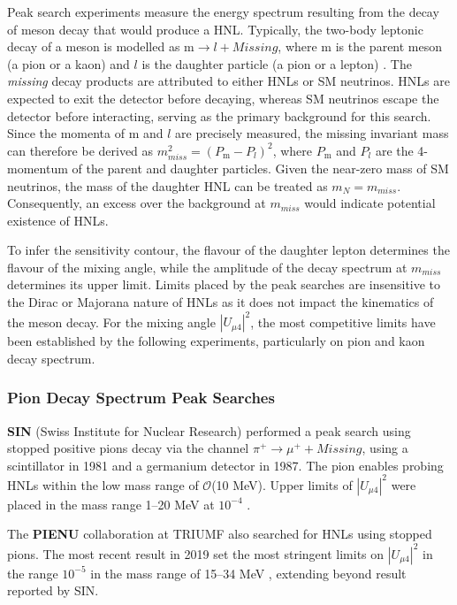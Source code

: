 Peak search experiments measure the energy spectrum  resulting from the decay of meson decay that would produce a HNL. 
Typically, the two-body leptonic decay of a meson is modelled as $\text{m}\rightarrow l + Missing$, where $\text{m}$ is the parent meson (a pion or a kaon) and $l$ is the daughter particle (a pion or a lepton) \cite{OwenPhD}.
The \textit{missing} decay products are attributed to either HNLs or SM neutrinos.
HNLs are expected to exit the detector before decaying, whereas SM neutrinos escape the detector before interacting, serving as the primary background for this search.
Since the momenta of m and $l$ are precisely measured, the missing invariant mass can therefore be derived as $m^{2}_{miss} = (P_{\text{m}} - P_{l})^{2}$, where $P_{\text{m}}$ and $P_{l}$ are the 4-momentum of the parent and daughter particles.
Given the near-zero mass of SM neutrinos, the mass of the daughter HNL can be treated as $m_{N} = m_{miss}$.
Consequently, an excess over the background at $m_{miss}$ would indicate potential existence of HNLs.

To infer the sensitivity contour, the flavour of the daughter lepton determines the flavour of the mixing angle, while the amplitude of the decay spectrum at $m_{miss}$ determines  its upper limit.
Limits placed by the peak searches are insensitive to the Dirac or Majorana nature of HNLs as it does not impact the kinematics of the meson decay.
For the mixing angle $|U_{\mu4}|^{2}$, the most competitive limits have been established by the following experiments, particularly on pion and kaon decay spectrum.

\subsubsection{Pion Decay Spectrum Peak Searches}

\begin{coloritemize}
\item \textbf{SIN} (Swiss Institute for Nuclear Research) performed a peak search using stopped positive pions decay via the channel $\pi^{+} \rightarrow \mu^{+} + Missing$, using a scintillator in 1981 and a germanium detector in 1987.
The pion enables probing HNLs within the low mass range of $\mathcal{O}$(10 MeV).
Upper limits of $|U_{\mu4}|^{2}$ were placed in the mass range 1--20 MeV at $10^{-4}$ \cite{SIN1, SIN2, SIN3}.

\item The \textbf{PIENU} collaboration at TRIUMF also searched for HNLs using stopped pions.
The most recent result in 2019 set the most stringent limits on $|U_{\mu4}|^{2}$ in the range $10^{-5}$ in the mass range of 15--34 MeV \cite{PIENU}, extending beyond result reported by SIN.

\end{coloritemize}

